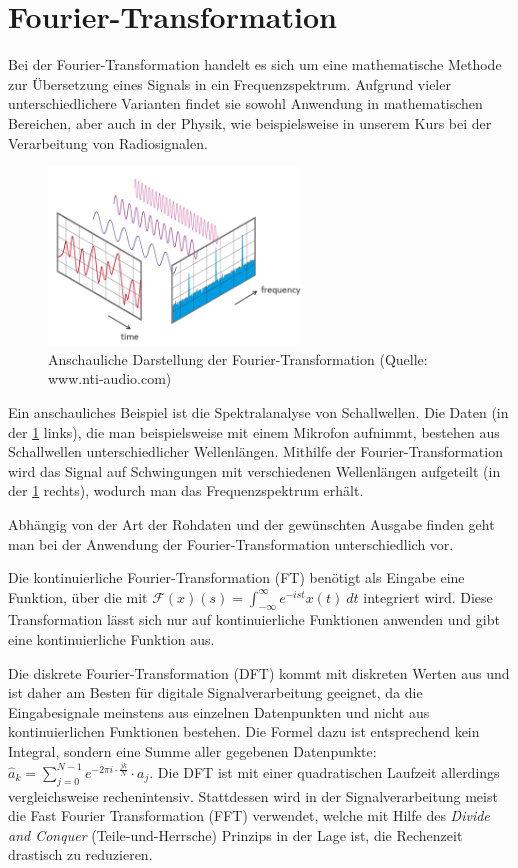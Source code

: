 \documentclass[]{dsadokumentation}
\begin{document}
\section{Fourier-Transformation}
Bei der Fourier-Transformation handelt es sich um eine mathematische Methode zur Übersetzung eines Signals in ein Frequenzspektrum. Aufgrund vieler unterschiedlichere Varianten findet sie sowohl Anwendung in mathematischen Bereichen, aber auch in der Physik, wie beispielsweise in unserem Kurs bei der Verarbeitung von Radiosignalen.
\begin{figure}[h!]
    \centering
    \includegraphics[width=0.6\textwidth]{k4.2/fourier.png}
    \caption{Anschauliche Darstellung der Fourier-Transformation (Quelle: www.nti-audio.com)}
    \label{k4.2.fourier}
\end{figure}
Ein anschauliches Beispiel ist die Spektralanalyse von Schallwellen. Die Daten (in der \cref{k4.2.fourier} links), die man beispielsweise mit einem Mikrofon aufnimmt, bestehen aus Schallwellen unterschiedlicher Wellenlängen. Mithilfe der Fourier-Transformation wird das Signal auf Schwingungen mit verschiedenen Wellenl\"angen aufgeteilt (in der \cref{k4.2.fourier} rechts), wodurch man das Frequenzspektrum erhält.

Abhängig von der Art der Rohdaten und der gewünschten Ausgabe finden geht man bei der Anwendung der Fourier-Transformation unterschiedlich vor.

Die kontinuierliche Fourier-Transformation (FT) benötigt als Eingabe eine Funktion, über die mit $\mathcal{F}(x)(s)=\int_{-\infty}^{\infty}e^{-ist}x(t)\ dt$ integriert wird. Diese Transformation lässt sich nur auf kontinuierliche Funktionen anwenden und gibt eine kontinuierliche Funktion aus.

Die diskrete Fourier-Transformation (DFT) kommt mit diskreten Werten aus und ist daher am Besten für digitale Signalverarbeitung geeignet, da die Eingabesignale meinstens aus einzelnen Datenpunkten und nicht aus kontinuierlichen Funktionen bestehen. Die Formel dazu ist entsprechend kein Integral, sondern eine Summe aller gegebenen Datenpunkte: $\hat a_k = \sum\limits_{j=0}^{N-1}e^{-2\pi i\cdot\frac{jk}{N}}\cdot a_j$. Die DFT ist mit einer quadratischen Laufzeit allerdings vergleichsweise rechenintensiv. Stattdessen wird in der Signalverarbeitung meist die Fast Fourier Transformation (FFT) verwendet, welche mit Hilfe des \emph{Divide and Conquer} (Teile-und-Herrsche) Prinzips in der Lage ist, die Rechenzeit drastisch zu reduzieren.
\end{document}
